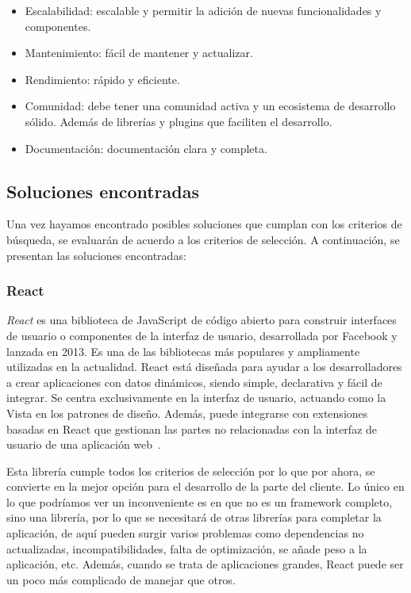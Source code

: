 \begin{itemize}
    \item Escalabilidad: escalable y permitir la adición de nuevas funcionalidades y componentes.
    \item Mantenimiento: fácil de mantener y actualizar.
    \item Rendimiento: rápido y eficiente.
    \item Comunidad: debe tener una comunidad activa y un ecosistema de desarrollo sólido. Además de librerías y plugins que faciliten el desarrollo.
    \item Documentación: documentación clara y completa.
\end{itemize}

\subsection{Soluciones encontradas}

Una vez hayamos encontrado posibles soluciones que cumplan con los criterios de búsqueda, se evaluarán de acuerdo a los criterios de selección. A continuación, se presentan las soluciones encontradas:

\subsubsection{React}

\textit{React} es una biblioteca de JavaScript de código abierto para construir interfaces de usuario o componentes de la interfaz de usuario, desarrollada por Facebook y lanzada en 2013. Es una de las bibliotecas más populares y ampliamente utilizadas en la actualidad. React está diseñada para ayudar a los desarrolladores a crear aplicaciones con datos dinámicos, siendo simple, declarativa y fácil de integrar. Se centra exclusivamente en la interfaz de usuario, actuando como la Vista en los patrones de diseño. Además, puede integrarse con extensiones basadas en React que gestionan las partes no relacionadas con la interfaz de usuario de una aplicación web~\cite{react-wikipedia}. 

Esta librería cumple todos los criterios de selección por lo que por ahora, se convierte en la mejor opción para el desarrollo de la parte del cliente. Lo único en lo que podríamos ver un inconveniente es en que no es un framework completo, sino una librería, por lo que se necesitará de otras librerías para completar la aplicación, de aquí pueden surgir varios problemas como dependencias no actualizadas, incompatibilidades, falta de optimización, se añade peso a la aplicación, etc. Además, cuando se trata de aplicaciones grandes, React puede ser un poco más complicado de manejar que otros.

